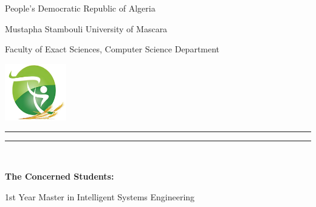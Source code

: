 \begin{titlepage}
	\centering
	{\large 
		People's Democratic Republic of Algeria
		\par}
	
	
	{\Large Mustapha Stambouli University of Mascara\par}
	
	{\Large Faculty of Exact Sciences, Computer Science Department\par} 
	
	\vspace{2cm}
	\includegraphics[width=0.2\textwidth]{assets/univ.png}\par
	\vspace{1cm}
	
	\vspace{1cm}
	\rule{\textwidth}{2pt}
	{\LARGE \bf{\MakeTitle}\par}
	\rule{\textwidth}{2pt}\\
	
	\vspace{2cm}
	    \begin{minipage}{\textwidth}
	    	\raggedright
	    	\Large \bf{The Concerned Students:}\par
	    	\hspace{1.5cm}\studentOne\par
	    	\hspace{1.5cm}\studentTwo\par
	    	\hspace{1.5cm}\studentThree\par
	    	\hspace{1.5cm}\studentFour
	    \end{minipage}
	\vspace{2cm}
	
	{\large 1st Year Master in Intelligent Systems Engineering}
	
	
	
\end{titlepage}